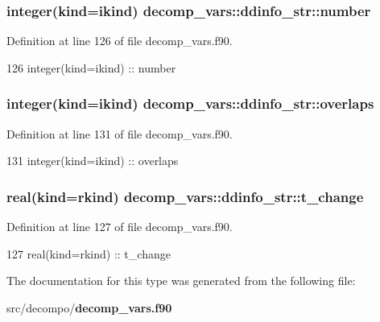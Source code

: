 \subsubsection[{number}]{\setlength{\rightskip}{0pt plus 5cm}integer(kind=ikind) decomp\+\_\+vars\+::ddinfo\+\_\+str\+::number\hspace{0.3cm}{\ttfamily [private]}}\label{structdecomp__vars_1_1ddinfo__str_a3fad03c6185d5c466e293bdde8ac6dad}


Definition at line 126 of file decomp\+\_\+vars.\+f90.


\begin{DoxyCode}
126     \textcolor{keywordtype}{integer(kind=ikind)} :: number
\end{DoxyCode}
\subsubsection[{overlaps}]{\setlength{\rightskip}{0pt plus 5cm}integer(kind=ikind) decomp\+\_\+vars\+::ddinfo\+\_\+str\+::overlaps\hspace{0.3cm}{\ttfamily [private]}}\label{structdecomp__vars_1_1ddinfo__str_a2f405949fed6799acb264de1e476420c}


Definition at line 131 of file decomp\+\_\+vars.\+f90.


\begin{DoxyCode}
131     \textcolor{keywordtype}{integer(kind=ikind)} :: overlaps
\end{DoxyCode}
\subsubsection[{t\+\_\+change}]{\setlength{\rightskip}{0pt plus 5cm}real(kind=rkind) decomp\+\_\+vars\+::ddinfo\+\_\+str\+::t\+\_\+change\hspace{0.3cm}{\ttfamily [private]}}\label{structdecomp__vars_1_1ddinfo__str_aaa4c75d8c450ed951bf7a108fe1a3456}


Definition at line 127 of file decomp\+\_\+vars.\+f90.


\begin{DoxyCode}
127     \textcolor{keywordtype}{real(kind=rkind)} :: t\_change
\end{DoxyCode}


The documentation for this type was generated from the following file\+:\begin{DoxyCompactItemize}
\item 
src/decompo/{\bf decomp\+\_\+vars.\+f90}\end{DoxyCompactItemize}

